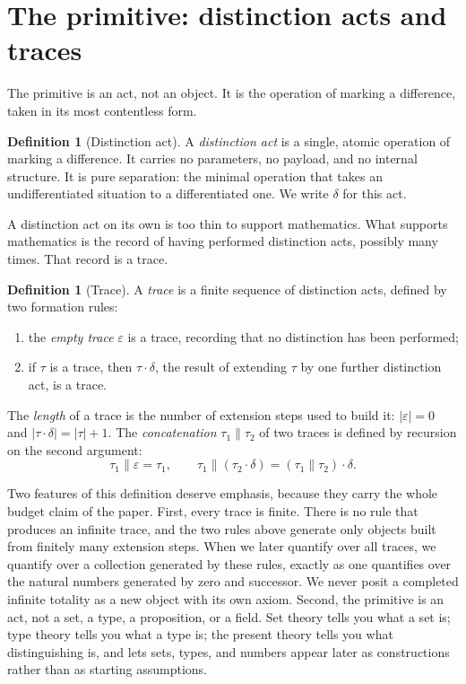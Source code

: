 \documentclass[11pt,a4paper]{article}
\theoremstyle{definition}
\newtheorem{definition}[theorem]{Definition}
\theoremstyle{remark}
\begin{document}
\section{The primitive: distinction acts and traces}\label{sec:kernel}

The primitive is an act, not an object. It is the operation of marking a
difference, taken in its most contentless form.

\begin{definition}[Distinction act]\label{def:act}
A \emph{distinction act} is a single, atomic operation of marking a difference.
It carries no parameters, no payload, and no internal structure. It is pure
separation: the minimal operation that takes an undifferentiated situation to a
differentiated one. We write $\delta$ for this act.
\end{definition}

A distinction act on its own is too thin to support mathematics. What supports
mathematics is the record of having performed distinction acts, possibly many
times. That record is a trace.

\begin{definition}[Trace]\label{def:trace}
A \emph{trace} is a finite sequence of distinction acts, defined by two
formation rules:
\begin{enumerate}[leftmargin=2em, label=\textup{(\roman*)}]
  \item the \emph{empty trace} $\varepsilon$ is a trace, recording that no
    distinction has been performed;
  \item if $\tau$ is a trace, then $\tau \cdot \delta$, the result of extending
    $\tau$ by one further distinction act, is a trace.
\end{enumerate}
The \emph{length} of a trace is the number of extension steps used to build it:
$|\varepsilon| = 0$ and $|\tau \cdot \delta| = |\tau| + 1$. The
\emph{concatenation} $\tau_1 \mathbin{\|} \tau_2$ of two traces is defined by
recursion on the second argument:
\[
  \tau_1 \mathbin{\|} \varepsilon = \tau_1,
  \qquad
  \tau_1 \mathbin{\|} (\tau_2 \cdot \delta) = (\tau_1 \mathbin{\|} \tau_2) \cdot \delta .
\]
\end{definition}

Two features of this definition deserve emphasis, because they carry the whole
budget claim of the paper. First, every trace is finite. There is no rule that
produces an infinite trace, and the two rules above generate only objects built
from finitely many extension steps. When we later quantify over all traces, we
quantify over a collection generated by these rules, exactly as one quantifies
over the natural numbers generated by zero and successor. We never posit a
completed infinite totality as a new object with its own axiom. Second, the
primitive is an act, not a set, a type, a proposition, or a field. Set theory
tells you what a set is; type theory tells you what a type is; the present
theory tells you what distinguishing is, and lets sets, types, and numbers
appear later as constructions rather than as starting assumptions.
\end{document}
